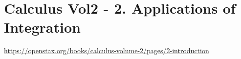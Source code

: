 \section{Calculus Vol2 - 2. Applications of Integration}

\url{https://openstax.org/books/calculus-volume-2/pages/2-introduction}


\clearpage

\clearpage

\clearpage

\clearpage
